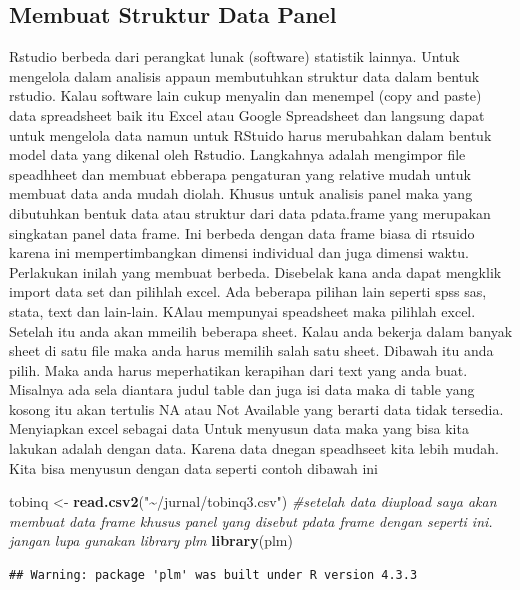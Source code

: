 \documentclass[
]{book}
\newenvironment{Shaded}{\begin{snugshade}}{\end{snugshade}}
\newcommand{\CommentTok}[1]{\textcolor[rgb]{0.56,0.35,0.01}{\textit{#1}}}
\newcommand{\FunctionTok}[1]{\textcolor[rgb]{0.13,0.29,0.53}{\textbf{#1}}}
\newcommand{\NormalTok}[1]{#1}
\newcommand{\OtherTok}[1]{\textcolor[rgb]{0.56,0.35,0.01}{#1}}
\newcommand{\StringTok}[1]{\textcolor[rgb]{0.31,0.60,0.02}{#1}}
\theoremstyle{definition}
\theoremstyle{definition}
\theoremstyle{definition}
\theoremstyle{definition}
\theoremstyle{remark}
\begin{document}
\hypertarget{membuat-struktur-data-panel}{%
\subsection{Membuat Struktur Data Panel}\label{membuat-struktur-data-panel}}

Rstudio berbeda dari perangkat lunak (software) statistik lainnya. Untuk mengelola dalam analisis appaun membutuhkan struktur data dalam bentuk rstudio. Kalau software lain cukup menyalin dan menempel (copy and paste) data spreadsheet baik itu Excel atau Google Spreadsheet dan langsung dapat untuk mengelola data namun untuk RStuido harus merubahkan dalam bentuk model data yang dikenal oleh Rstudio.
Langkahnya adalah mengimpor file speadhheet dan membuat ebberapa pengaturan yang relative mudah untuk membuat data anda mudah diolah. Khusus untuk analisis panel maka yang dibutuhkan bentuk data atau struktur dari data pdata.frame yang merupakan singkatan panel data frame. Ini berbeda dengan data frame biasa di rtsuido karena ini mempertimbangkan dimensi individual dan juga dimensi waktu. Perlakukan inilah yang membuat berbeda.
Disebelak kana anda dapat mengklik import data set dan pilihlah excel. Ada beberapa pilihan lain seperti spss sas, stata, text dan lain-lain. KAlau mempunyai speadsheet maka pilihlah excel.
Setelah itu anda akan mmeilih beberapa sheet. Kalau anda bekerja dalam banyak sheet di satu file maka anda harus memilih salah satu sheet. Dibawah itu anda pilih. Maka anda harus meperhatikan kerapihan dari text yang anda buat. Misalnya ada sela diantara judul table dan juga isi data maka di table yang kosong itu akan tertulis NA atau Not Available yang berarti data tidak tersedia.
Menyiapkan excel sebagai data
Untuk menyusun data maka yang bisa kita lakukan adalah dengan data. Karena data dnegan speadhseet kita lebih mudah. Kita bisa menyusun dengan data seperti contoh dibawah ini

\begin{Shaded}
\begin{Highlighting}[]
\NormalTok{tobinq }\OtherTok{\textless{}{-}} \FunctionTok{read.csv2}\NormalTok{(}\StringTok{"\textasciitilde{}/jurnal/tobinq3.csv"}\NormalTok{)}
\CommentTok{\#setelah data diupload saya akan membuat data frame khusus panel yang disebut pdata frame dengan seperti ini. jangan lupa gunakan library plm}
\FunctionTok{library}\NormalTok{(plm)}
\end{Highlighting}
\end{Shaded}

\begin{verbatim}
## Warning: package 'plm' was built under R version 4.3.3
\end{verbatim}
\end{document}
